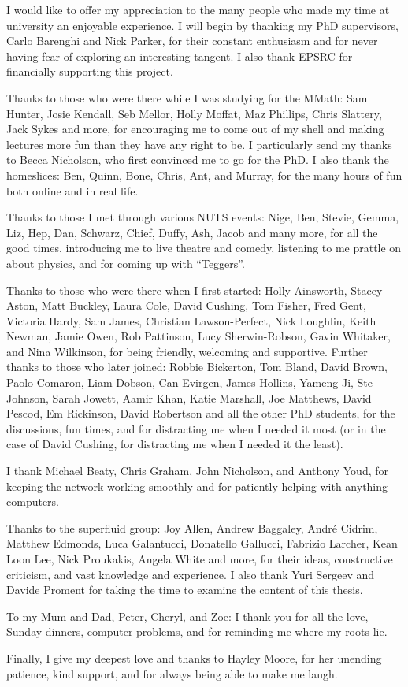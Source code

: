 \begin{acknowledgements}
 I would like to offer my appreciation to the many people who made my time at university an enjoyable experience. I will begin by thanking my PhD supervisors, Carlo Barenghi and Nick Parker, for their constant enthusiasm and for never having fear of exploring an interesting tangent. I also thank EPSRC for financially supporting this project.

 Thanks to those who were there while I was studying for the MMath: Sam Hunter, Josie Kendall, Seb Mellor, Holly Moffat, Maz Phillips, Chris Slattery, Jack Sykes and more, for encouraging me to come out of my shell and making lectures more fun than they have any right to be. I particularly send my thanks to Becca Nicholson, who first convinced me to go for the PhD. I also thank the homeslices: Ben, Quinn, Bone, Chris, Ant, and Murray, for the many hours of fun both online and in real life.

 Thanks to those I met through various NUTS events: Nige, Ben, Stevie, Gemma, Liz, Hep, Dan, Schwarz, Chief, Duffy, Ash, Jacob and many more, for all the good times, introducing me to live theatre and comedy, listening to me prattle on about physics, and for coming up with ``Teggers''. 

 Thanks to those who were there when I first started: Holly Ainsworth, Stacey Aston, Matt Buckley, Laura Cole, David Cushing, Tom Fisher, Fred Gent, Victoria Hardy, Sam James, Christian Lawson-Perfect, Nick Loughlin, Keith Newman, Jamie Owen, Rob Pattinson, Lucy Sherwin-Robson, Gavin Whitaker, and Nina Wilkinson, for being friendly, welcoming and supportive. Further thanks to those who later joined: Robbie Bickerton, Tom Bland, David Brown, Paolo Comaron, Liam Dobson, Can Evirgen, James Hollins, Yameng Ji, Ste Johnson, Sarah Jowett, Aamir Khan, Katie Marshall, Joe Matthews, David Pescod, Em Rickinson, David Robertson and all the other PhD students, for the discussions, fun times, and for distracting me when I needed it most (or in the case of David Cushing, for distracting me when I needed it the least).

 I thank Michael Beaty, Chris Graham, John Nicholson, and Anthony Youd, for keeping the network working smoothly and for patiently helping with anything computers.

 Thanks to the superfluid group: Joy Allen, Andrew Baggaley, Andr\'e Cidrim, Matthew Edmonds, Luca Galantucci, Donatello Gallucci, Fabrizio Larcher, Kean Loon Lee, Nick Proukakis, Angela White and more, for their ideas, constructive criticism, and vast knowledge and experience. I also thank Yuri Sergeev and Davide Proment for taking the time to examine the content of this thesis.

 To my Mum and Dad, Peter, Cheryl, and Zoe: I thank you for all the love, Sunday dinners, computer problems, and for reminding me where my roots lie.

 Finally, I give my deepest love and thanks to Hayley Moore, for her unending patience, kind support, and for always being able to make me laugh.


\end{acknowledgements}
\thispagestyle{empty}
\restoregeometry
